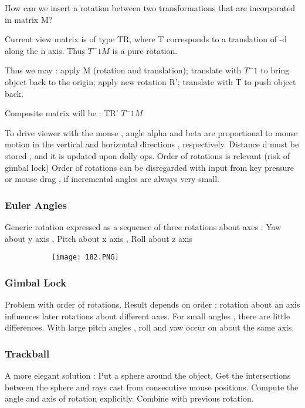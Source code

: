 \documentclass{article}
\begin{document}
How can we insert a rotation between two transformations that are incorporated in matrix M?

Current view matrix is of type TR, where T corresponds to a translation of -d along the n axis. Thus $T^-1 M$ is a pure rotation.

Thus we may : apply M (rotation and translation); translate with $T^-1$ to bring object back to the origin; apply new rotation R'; translate with T to push object back.

Composite matrix will be : TR' $T^-1 M$


To drive viewer with the mouse , angle alpha and beta are proportional to mouse motion in the vertical and horizontal directions , respectively.
Distance d must be stored , and it is updated upon dolly ops.
Order of rotations is relevant (risk of gimbal lock)
Order of rotations can be disregarded with input from key pressure or mouse drag , if incremental angles are always very small.


\subsubsection{Euler Angles}

Generic rotation expressed as a sequence of three rotations about axes : Yaw about y axis , Pitch about x axis , Roll about z axis

\begin{figure}[ht!]
  \centering
  \begin{subfigure}[b]{0.35\linewidth}
    \texttt{[image: 182.PNG]}
  \end{subfigure}
\end{figure}

\subsubsection{Gimbal Lock}

Problem with order of rotations.
Result depends on order : rotation about an axis influences later rotations about different axes.
For small angles , there are little differences.
With large pitch angles , roll and yaw occur on about the same axis.

\subsubsection{Trackball}
A more elegant solution : 
Put a sphere around the object. Get the intersections between the sphere and rays cast from consecutive mouse positions. Compute the angle and axis of rotation explicitly. Combine with previous rotation.
\end{document}
